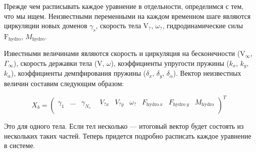 \documentclass[14pt]{extreport}
\newcommand{\br}[1]{\boldsymbol{\mathrm{#1}}}
\renewcommand{\vec}[1]{\br{#1}}
\newenvironment{packed_enum}{
\begin{enumerate}
  \setlength{\itemsep}{1pt}
  \setlength{\parskip}{0pt}
  \setlength{\parsep}{0pt}
}{\end{enumerate}}
\begin{document}

Прежде чем расписывать каждое уравнение в отдельности, определимся с тем, что мы ищем. Неизвестными переменными на каждом временном шаге являются циркуляции новых доменов $\gamma_s$, скорость тела $\vec V_?$, $\omega_?$, гидродинамические силы $\vec F_\text{hydro}$, $M_\text{hydro}$.

Известными величинами являются скорость и циркуляция на бесконечности ($\vec V_\infty$, $\Gamma_\infty$), скорость державки тела ($\vec V$, $\omega$), коэффициенты упругости пружины ($k_x$, $k_y$, $k_\alpha$), коэффициенты демпфирования пружины ($\delta_x$, $\delta_y$, $\delta_\alpha$). Вектор неизвестных величин составим следующим образом:

\begin{equation}
\label{eq_5_3_1}
X_b =
\left(\begin{matrix}
\gamma_1 & \dotsc & \gamma_{N_s}& ~~V_{?x}& V_{?y}& \omega_?& F_{\text{hydro}~x}& F_{\text{hydro}~y} &M_\text{hydro}\\
\end{matrix}\right)^T
\end{equation}

Это для одного тела. Если тел несколько --- итоговый вектор будет состоять из нескольких таких частей. Теперь придется подробно расписать каждое уравнение в системе. 

\end{document}
